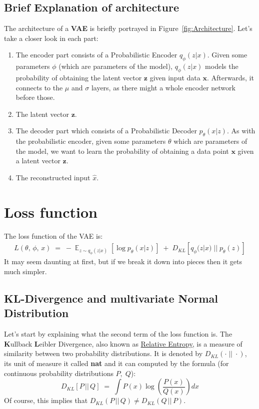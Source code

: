 \documentclass[12pt]{report}
\DeclareMathOperator{\E}{\mathbb{E}}
\begin{document}
\subsection*{Brief Explanation of architecture}
The architecture of a \textbf{VAE} is briefly portrayed in 
Figure~\ref{fig:Architecture}. Let's take a closer look in each part:

\begin{enumerate}
    \item The encoder part consists of a Probabilistic Encoder $q_{\phi}(z | x)$.
        Given some parameters $\phi$ (which are parameters of the model),
        $q_{\phi}(z | x)$ models the probability of obtaining the latent vector
        $\textbf{z}$ given input data $\textbf{x}$. Afterwards, it connects to
        the $\mu$ and $\sigma$ layers, as there might a whole encoder network
        before those.
    \item The latent vector $\textbf{z}$.
    \item The decoder part which consists of a Probabilistic Decoder
        $p_{\theta}(x | z)$. As with the probabilistic encoder, given some
        parameters $\theta$ which are parameters of the model, we want to learn
        the probability of obtaining a data point $\textbf{x}$ given a latent
        vector $\textbf{z}$.
    \item The reconstructed input $\hat{x}$.
\end{enumerate}
\clearpage

\section*{Loss function}
The loss function of the VAE is:
\begin{align*}
    L(\theta,\, \phi,\, x) \;=\; -\E_{z \sim q_{\phi}(z | x)}
                                    \left[\log p_{\theta}(x | z) \right]\;
                              +\; D_{KL}\left[q_{\phi}(z | x) \;||\; p_{\theta}(z) \right]
\end{align*}
It may seem daunting at first, but if we break it down into pieces then it gets
much simpler.

\subsection*{KL-Divergence and multivariate Normal Distribution}
Let's start by explaining what the second term of the loss function is. The
\textbf{K}ullback \textbf{L}eibler Divergence, also known as
\href{https://en.wikipedia.org/wiki/Relative_entropy}{Relative Entropy}, is
a measure of similarity between two probability distributions. It is denoted by
$D_{KL}(\cdot \;||\; \cdot)$, its unit of measure it called \textbf{nat} and it
can computed by the formula (for continuous probability distributions $P,\; Q$):
\begin{equation}\label{eq:KLD}
    D_{KL} \left[ P \,||\, Q \right] \;=\;
        \int P(x) \log\left(\frac{P(x)}{Q(x)}\right) dx
\end{equation}
Of course, this implies that $D_{KL} (P \,||\, Q) \neq D_{KL} (Q \,||\, P)$.
\bigskip
\end{document}
